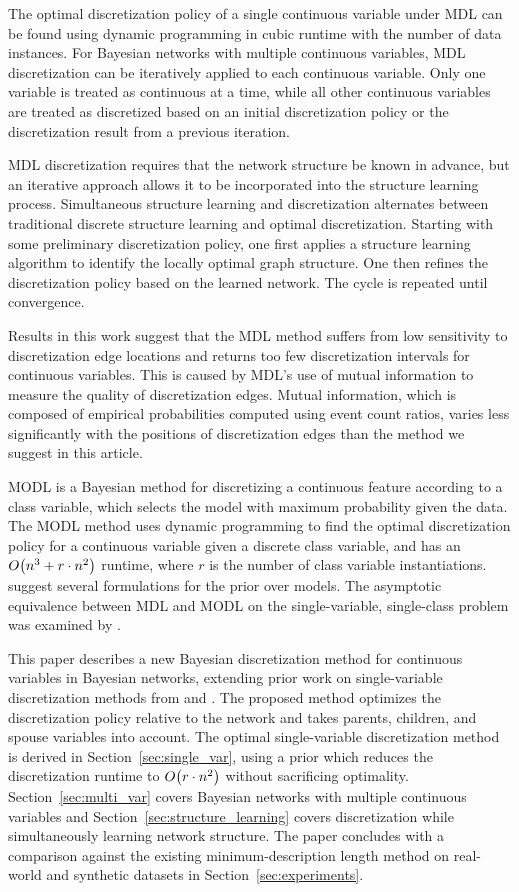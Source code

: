 The optimal discretization policy of a single continuous variable under MDL can be found using dynamic programming in cubic runtime with the number of data instances.
For Bayesian networks with multiple continuous variables, MDL discretization can be iteratively applied to each continuous variable.
Only one variable is treated as continuous at a time, while all other continuous variables are treated as discretized based on an initial discretization policy or the discretization result from a previous iteration.

MDL discretization requires that the network structure be known in advance, but an iterative approach allows it to be incorporated into the structure learning process.
Simultaneous structure learning and discretization alternates between traditional discrete structure learning and optimal discretization.
Starting with some preliminary discretization policy, one first applies a structure learning algorithm to identify the locally optimal graph structure.
One then refines the discretization policy based on the learned network.
The cycle is repeated until convergence.

Results in this work suggest that the MDL method suffers from low sensitivity to discretization edge locations and returns too few discretization intervals for continuous variables.
This is caused by MDL's use of mutual information to measure the quality of discretization edges.
Mutual information, which is composed of empirical probabilities computed using event count ratios, varies less significantly with the positions of discretization edges than the method we suggest in this article.


MODL \citep{Boulle_2006} is a Bayesian method for discretizing a continuous feature according to a class variable, which selects the model with maximum probability given the data.
The MODL method uses dynamic programming to find the optimal discretization policy for a continuous variable given a discrete class variable, and has an $\bigo\paren{n^3 + r \cdot n^2}$ runtime, where $r$ is the number of class variable instantiations.
\cite{Lustgarten_2011} suggest several formulations for the prior over models. The asymptotic equivalence between MDL and MODL on the single-variable, single-class problem was examined by \citet{VL_2000}.

This paper describes a new Bayesian discretization method for continuous variables in Bayesian networks, extending prior work on single-variable discretization methods from \citet{Boulle_2006} and \citet{Lustgarten_2011}.
The proposed method optimizes the discretization policy relative to the network and takes parents, children, and spouse variables into account.
The optimal single-variable discretization method is derived in Section~\ref{sec:single_var}, using a prior which reduces the discretization runtime to $\bigo\paren{r \cdot n^2}$ without sacrificing optimality.
Section~\ref{sec:multi_var} covers Bayesian networks with multiple continuous variables and Section~\ref{sec:structure_learning} covers discretization while simultaneously learning network structure.
The paper concludes with a comparison against the existing minimum-description length \citep{Friedman_1996} method on real-world and synthetic datasets in Section~\ref{sec:experiments}.

